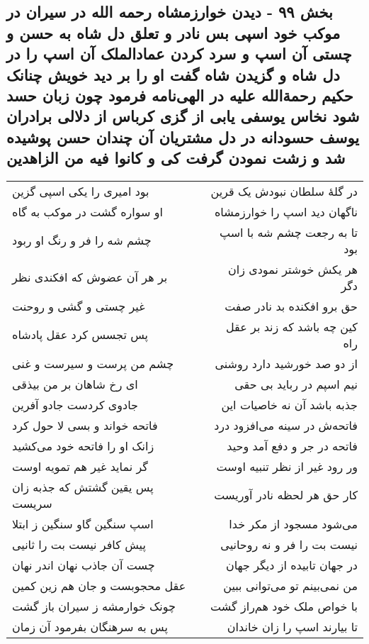 \begin{center}
\section*{بخش ۹۹ - دیدن خوارزمشاه رحمه الله در سیران در موکب خود اسپی بس نادر و تعلق دل شاه به حسن و چستی آن اسپ و سرد کردن  عمادالملک آن اسپ را در دل شاه و گزیدن شاه گفت او را بر دید  خویش چنانک حکیم رحمةالله علیه  در الهی‌نامه فرمود چون زبان حسد شود نخاس  یوسفی یابی از گزی کرباس  از دلالی برادران یوسف حسودانه در دل مشتریان آن چندان حسن  پوشیده شد و زشت نمودن گرفت کی و کانوا فیه من الزاهدین}
\label{sec:sh099}
\begin{longtable}{l p{0.5cm} r}
بود امیری را یکی اسپی گزین
&&
در گلهٔ سلطان نبودش یک قرین
\\
او سواره گشت در موکب به گاه
&&
ناگهان دید اسپ را خوارزمشاه
\\
چشم شه را فر و رنگ او ربود
&&
تا به رجعت چشم شه با اسپ بود
\\
بر هر آن عضوش که افکندی نظر
&&
هر یکش خوشتر نمودی زان دگر
\\
غیر چستی و گشی و روحنت
&&
حق برو افکنده بد نادر صفت
\\
پس تجسس کرد عقل پادشاه
&&
کین چه باشد که زند بر عقل راه
\\
چشم من پرست و سیرست و غنی
&&
از دو صد خورشید دارد روشنی
\\
ای رخ شاهان بر من بیذقی
&&
نیم اسپم در رباید بی حقی
\\
جادوی کردست جادو آفرین
&&
جذبه باشد آن نه خاصیات این
\\
فاتحه خواند و بسی لا حول کرد
&&
فاتحه‌ش در سینه می‌افزود درد
\\
زانک او را فاتحه خود می‌کشید
&&
فاتحه در جر و دفع آمد وحید
\\
گر نماید غیر هم تمویه اوست
&&
ور رود غیر از نظر تنبیه اوست
\\
پس یقین گشتش که جذبه زان سریست
&&
کار حق هر لحظه نادر آوریست
\\
اسپ سنگین گاو سنگین ز ابتلا
&&
می‌شود مسجود از مکر خدا
\\
پیش کافر نیست بت را ثانیی
&&
نیست بت را فر و نه روحانیی
\\
چست آن جاذب نهان اندر نهان
&&
در جهان تابیده از دیگر جهان
\\
عقل محجوبست و جان هم زین کمین
&&
من نمی‌بینم تو می‌توانی ببین
\\
چونک خوارمشه ز سیران باز گشت
&&
با خواص ملک خود هم‌راز گشت
\\
پس به سرهنگان بفرمود آن زمان
&&
تا بیارند اسپ را زان خاندان

\end{longtable}
\end{center}
